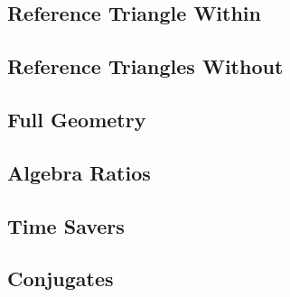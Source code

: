 
\subsection{Reference Triangle Within}
\subsection{Reference Triangles Without}
\subsection{Full Geometry}
\subsection{Algebra Ratios}
\subsection{Time Savers}
\subsection{Conjugates}
